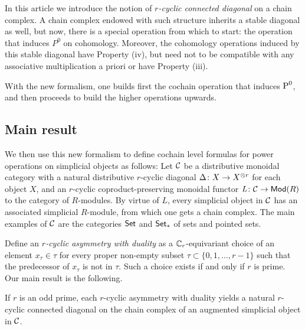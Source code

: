 In this article we introduce the notion of \emph{$r$-cyclic connected diagonal} on a chain complex.
A chain complex endowed with such structure inherits a stable diagonal as well, but now, there is a special operation from which to start: the operation that induces $P^0$ on cohomology.
Moreover, the cohomology operations induced by this stable diagonal have Property (iv), but need not to be compatible with any associative multiplication a priori or have Property (iii).

With the new formalism, one builds first the cochain operation that induces $\operatorname{P}^0$, and then proceeds to build the higher operations upwards.

\subsection{Main result}

We then use this new formalism to define cochain level formulas for power operations on simplicial objects as follows: Let $\mathcal{C}$ be a distributive monoidal category with a natural distributive $r$-cyclic diagonal $\Delta \colon X \to X^{\otimes r}$ for each object $X$, and an $r$-cyclic coproduct-preserving monoidal functor $\operatorname{{\it L}} \colon \mathcal{C} \to \mathsf{Mod}(R)$ to the category of $R$-modules.
By virtue of $L$, every simplicial object in $\mathcal{C}$ has an associated simplicial $R$-module, from which one gets a chain complex.
The main examples of $\mathcal{C}$ are the categories $\mathsf{Set}$ and $\mathsf{Set}_*$ of sets and pointed sets.

Define an \emph{$r$-cyclic asymmetry with duality} as a $\mathbb{C}_r$-equivariant choice of an element $x_\tau\in \tau$ for every proper non-empty subset $\tau \subset \{0,1,\dots,r-1\}$ such that the predecessor of $x_\tau$ is not in $\tau$.
Such a choice exists if and only if $r$ is prime.
Our main result is the following.

\begin{theorem}\label{thm:main}
	If $r$ is an odd prime, each $r$-cyclic asymmetry with duality yields a natural $r$-cyclic connected diagonal on the chain complex of an augmented simplicial object in $\mathcal{C}$.
\end{theorem}

